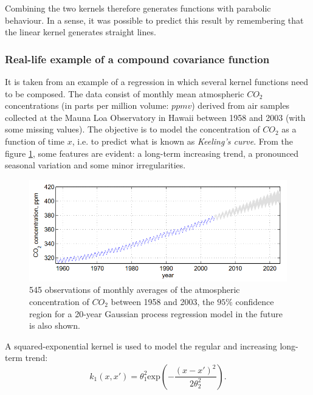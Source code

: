 Combining the two kernels therefore generates functions with parabolic behaviour. In a sense, it was possible to predict this result by remembering that the linear kernel generates straight lines.

\newpage



\subsubsection{Real-life example of a compound covariance function}\label{section: mauna loa}
It is taken from \cite{rasmussen_gaussian_2006} an example of a regression in which several kernel functions need to be composed.  The data consist of monthly mean atmospheric $CO_2$ concentrations (in parts per million volume: $ppmv$) derived from air samples collected at the Mauna Loa Observatory in Hawaii between 1958 and 2003 (with some missing values). The objective is to model the concentration of $CO_2$ as a function of time $x$, i.e. to predict what is known as \textit{Keeling's curve}. From the figure \ref{CO2}, some features are evident: a long-term increasing trend, a pronounced seasonal variation and some minor irregularities. 


\begin{figure}[ht]
    \centering
    \includegraphics[width=1\textwidth]{images/Gaussian process/Co2_example.PNG}
    \caption{545 observations of monthly averages of the atmospheric concentration of $CO_2$ between 1958 and 2003, the $95\%$ confidence region for a 20-year Gaussian process regression model in the future is also shown. \cite{rasmussen_gaussian_2006}}
    \label{CO2}
\end{figure}


A squared-exponential kernel is used to model the regular and increasing long-term trend:
\[
k_1(x,x')=\theta_1^2\text{exp}\left(-\frac{(x-x')^2}{2\theta_2^2}\right).
\]


